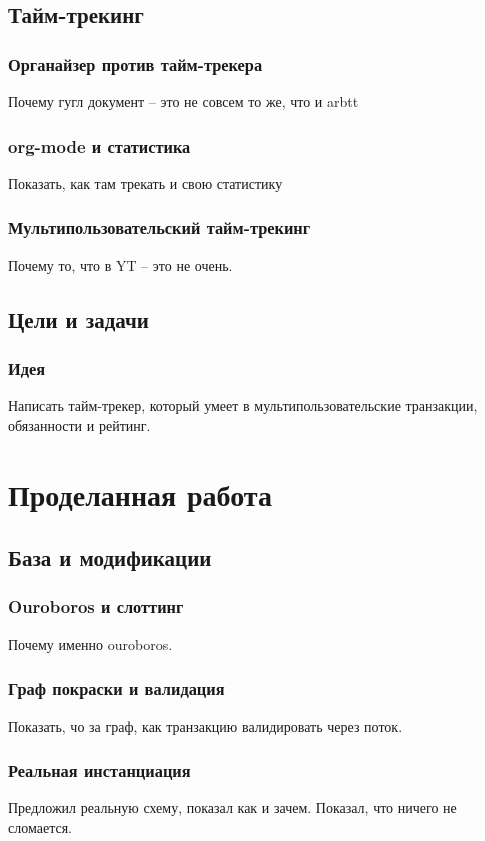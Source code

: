 \documentclass[11pt,handout,pdf,hyperref={unicode}]{beamer}
\begin{document}
\subsection{Тайм-трекинг}

\begin{frame}
  \frametitle{Органайзер против тайм-трекера}

  Почему гугл документ -- это не совсем то же, что и arbtt
\end{frame}

\begin{frame}
  \frametitle{org-mode и статистика}

  Показать, как там трекать и свою статистику
\end{frame}

\begin{frame}
  \frametitle{Мультипользовательский тайм-трекинг}

  Почему то, что в YT -- это не очень.
\end{frame}

\subsection{Цели и задачи}

\begin{frame}
  \frametitle{Идея}

  Написать тайм-трекер, который умеет в мультипользовательские
  транзакции, обязанности и рейтинг.
\end{frame}

\section{Проделанная работа}

\subsection{База и модификации}

\begin{frame}
  \frametitle{Ouroboros и слоттинг}
  Почему именно ouroboros.
\end{frame}

\begin{frame}
  \frametitle{Граф покраски и валидация }

  Показать, чо за граф, как транзакцию валидировать через поток.
\end{frame}

\begin{frame}
  \frametitle{Реальная инстанциация}

  Предложил реальную схему, показал как и зачем. Показал, что ничего
  не сломается.
\end{frame}
\end{document}

